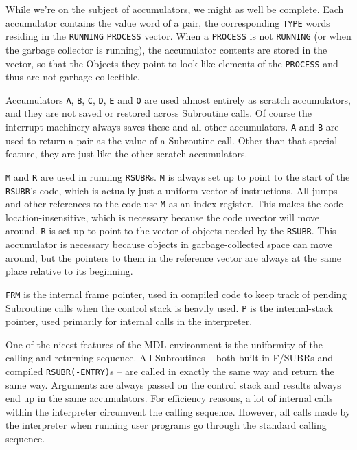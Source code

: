 \documentclass[a4paper,]{article}
\begin{document}
While we're on the subject of accumulators, we might as well be complete. Each accumulator contains the value word of a
pair, the corresponding \texttt{TYPE} words residing in the \texttt{RUNNING} \texttt{PROCESS} vector. When a
\texttt{PROCESS} is not \texttt{RUNNING} (or when the garbage collector is running), the accumulator contents are stored in
the vector, so that the Objects they point to look like elements of the \texttt{PROCESS} and thus are not
garbage-collectible.

Accumulators \texttt{A}, \texttt{B}, \texttt{C}, \texttt{D}, \texttt{E} and \texttt{O} are used almost entirely as scratch
accumulators, and they are not saved or restored across Subroutine calls. Of course the interrupt machinery always saves
these and all other accumulators. \texttt{A} and \texttt{B} are used to return a pair as the value of a Subroutine call.
Other than that special feature, they are just like the other scratch accumulators.

\texttt{M} and \texttt{R} are used in running \texttt{RSUBR}s. \texttt{M} is always set up to point to the start of the
\texttt{RSUBR}'s code, which is actually just a uniform vector of instructions. All jumps and other references to the code
use \texttt{M} as an index register. This makes the code location-insensitive, which is necessary because the code uvector
will move around. \texttt{R} is set up to point to the vector of objects needed by the \texttt{RSUBR}. This accumulator is
necessary because objects in garbage-collected space can move around, but the pointers to them in the reference vector are
always at the same place relative to its beginning.

\texttt{FRM} is the internal frame pointer, used in compiled code to keep track of pending Subroutine calls when the
control stack is heavily used. \texttt{P} is the internal-stack pointer, used primarily for internal calls in the
interpreter.

One of the nicest features of the MDL environment is the uniformity of the calling and returning sequence. All Subroutines
-- both built-in F/SUBRs and compiled \texttt{RSUBR(-ENTRY)}s -- are called in exactly the same way and return the same
way. Arguments are always passed on the control stack and results always end up in the same accumulators. For efficiency
reasons, a lot of internal calls within the interpreter circumvent the calling sequence. However, all calls made by the
interpreter when running user programs go through the standard calling sequence.
\end{document}
